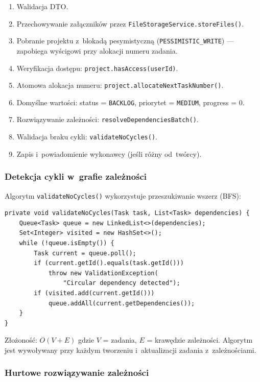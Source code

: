 \begin{enumerate}
    \item Walidacja DTO.
    \item Przechowywanie załączników przez \texttt{FileStorageService.storeFiles()}.
    \item Pobranie projektu z~blokadą pesymistyczną (\texttt{PESSIMISTIC\_WRITE}) --- zapobiega wyścigowi przy alokacji numeru zadania.
    \item Weryfikacja dostępu: \texttt{project.hasAccess(userId)}.
    \item Atomowa alokacja numeru: \texttt{project.allocateNextTaskNumber()}.
    \item Domyślne wartości: status = \texttt{BACKLOG}, priorytet = \texttt{MEDIUM}, progress = 0.
    \item Rozwiązywanie zależności: \texttt{resolveDependenciesBatch()}.
    \item Walidacja braku cykli: \texttt{validateNoCycles()}.
    \item Zapis i~powiadomienie wykonawcy (jeśli różny od~twórcy).
\end{enumerate}

\subsubsection{Detekcja cykli w~grafie zależności}

Algorytm \texttt{validateNoCycles()} wykorzystuje przeszukiwanie wszerz (BFS):

\begin{verbatim}
private void validateNoCycles(Task task, List<Task> dependencies) {
    Queue<Task> queue = new LinkedList<>(dependencies);
    Set<Integer> visited = new HashSet<>();
    while (!queue.isEmpty()) {
        Task current = queue.poll();
        if (current.getId().equals(task.getId()))
            throw new ValidationException(
                "Circular dependency detected");
        if (visited.add(current.getId()))
            queue.addAll(current.getDependencies());
    }
}
\end{verbatim}

Złożoność: $O(V + E)$ gdzie $V$ = zadania, $E$ = krawędzie zależności. Algorytm jest wywoływany przy każdym tworzeniu i~aktualizacji zadania z~zależnościami.

\subsubsection{Hurtowe rozwiązywanie zależności}

